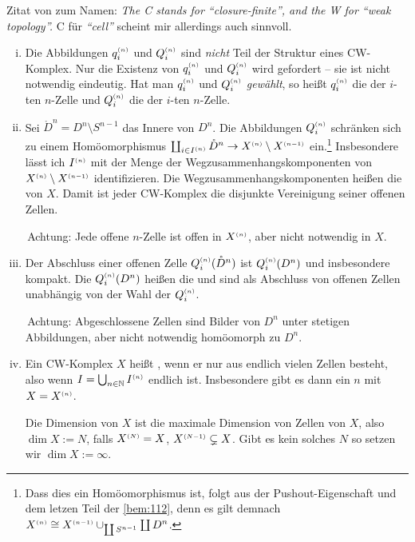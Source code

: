 Zitat von  zum Namen: \textenglish{\emph{The C stands for \enquote{closure-finite}, and the W for \enquote{weak topology}.}} C für \emph{\enquote{cell}} scheint mir allerdings auch sinnvoll.

\begin{bemerkung}
	\begin{enumerate}[(i)]
		\item Die Abbildungen $q_i^{\scriptscriptstyle(n)}$ und $Q_i^{\scriptscriptstyle(n)}$ sind \emph{nicht} Teil der Struktur eines CW-Komplex. 
		Nur die Existenz von $q_i^{\scriptscriptstyle(n)}$ und $Q_i^{\scriptscriptstyle(n)}$ wird gefordert -- sie ist nicht notwendig eindeutig. 
		Hat man $q_i^{\scriptscriptstyle(n)}$ und $Q_i^{\scriptscriptstyle(n)}$ \emph{gewählt}, so heißt $q_i^{\scriptscriptstyle(n)}$ die  der $i$-ten $n$-Zelle und $Q_i^{\scriptscriptstyle(n)}$ die  der $i$-ten $n$-Zelle.
		\item Sei $\mathring{D}^n = D^n \setminus S^{n-1}$ das Innere von $D^n$. 
		Die Abbildungen $Q_i^{\scriptscriptstyle(n)}$ schränken sich zu einem Homöomorphismus $\coprod_{i \in I^{(n)}} \mathring{D}^n \to X^{\scriptscriptstyle(n)} \setminus X^{\scriptscriptstyle(n-1)}$ ein.\footnote{Dass dies ein Homöomorphismus ist, folgt aus der Pushout-Eigenschaft und dem letzen Teil der \autoref{bem:112}, denn es gilt demnach $X^{\scriptscriptstyle(n)}\cong X^{\scriptscriptstyle(n-1)}\cup_{\coprod S^{n-1}} \coprod D^n$.} 
		Insbesondere lässt ich $I^{\scriptscriptstyle(n)}$ mit der Menge der Wegzusammenhangskomponenten von $X^{\scriptscriptstyle(n)} \setminus X^{\scriptscriptstyle(n-1)}$ identifizieren. 
		Die Wegzusammenhangskomponenten heißen die  von $X$. 
		Damit ist jeder CW-Komplex die disjunkte Vereinigung seiner offenen Zellen.
	
		\faWarning\,Achtung: Jede offene $n$-Zelle ist offen in $X^{\scriptscriptstyle(n)}$, aber nicht notwendig in $X$.
		\item Der Abschluss einer offenen Zelle $Q_i^{\scriptscriptstyle(n)}(\mathring{D}^n)$ ist $Q_i^{\scriptscriptstyle(n)}(D^n)$ und insbesondere kompakt. 
		Die $Q_i^{\scriptscriptstyle(n)}(D^n)$ heißen die  und sind als Abschluss von offenen Zellen unabhängig von der Wahl der $Q_i^{\scriptscriptstyle(n)}$.
	
		\faWarning\,Achtung: Abgeschlossene Zellen sind Bilder von $D^n$ unter stetigen Abbildungen, aber nicht notwendig homöomorph zu $D^n$.
		\item Ein CW-Komplex $X$ heißt , wenn er nur aus endlich vielen Zellen besteht, also wenn 
		$I = \bigcup_{n \in \mathbb{N} } I^{\scriptscriptstyle(n)}$ endlich ist. 
		Insbesondere gibt es dann ein $n$ mit $X=X^{\scriptscriptstyle(n)}$.
	
		Die Dimension von $X$ ist die maximale Dimension von Zellen von $X$, also $\dim X := N$, falls $X^{\scriptscriptstyle(N)}=X$, $X^{\scriptscriptstyle(N-1)} \subsetneq X$. Gibt es kein solches $N$ so setzen wir $\dim X := \infty$.
	\end{enumerate}
\end{bemerkung}

